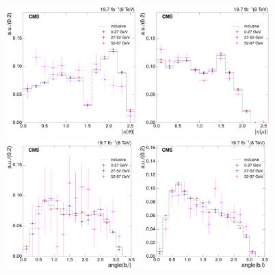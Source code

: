 \begin{figure}[hbtp]
    \centering
     \includegraphics[width=0.45\textwidth]{Chapters/04_Analysis/04b_XSections/images/8TeV/fit_variables/electron/MET/electron_absolute_eta/qcd/MET_electron_absolute_eta_0orMoreBtag_QCD_template_comparison.pdf}\hfill
     \includegraphics[width=0.45\textwidth]{Chapters/04_Analysis/04b_XSections/images/8TeV/fit_variables/muon/MET/muon_absolute_eta/qcd/MET_muon_absolute_eta_0orMoreBtag_QCD_template_comparison.pdf}\\
     \includegraphics[width=0.45\textwidth]{Chapters/04_Analysis/04b_XSections/images/8TeV/fit_variables/electron/MET/angle_bl/qcd/MET_angle_bl_1orMoreBtag_QCD_template_comparison.pdf}\hfill
     \includegraphics[width=0.45\textwidth]{Chapters/04_Analysis/04b_XSections/images/8TeV/fit_variables/muon/MET/angle_bl/qcd/MET_angle_bl_1orMoreBtag_QCD_template_comparison.pdf}\\

\end{figure}
